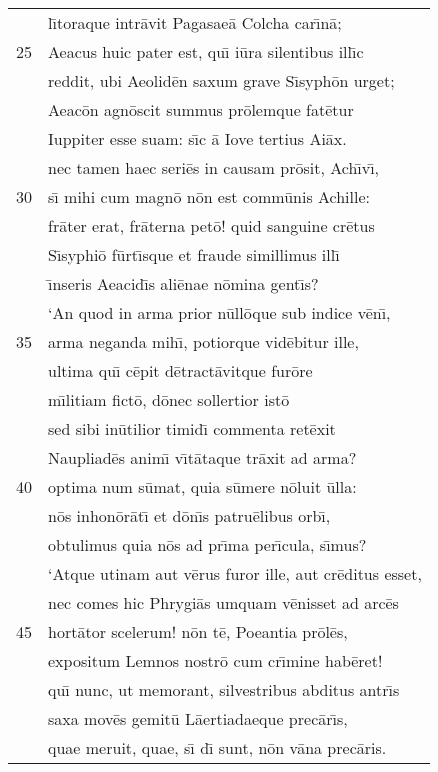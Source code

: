 \documentclass[paper=6in:9in,pagesize=pdftex,
               headinclude=on,footinclude=on,12pt]{scrbook}
\begin{document}
\begin{longtable}[p]{ r l }
 & l\={\i}toraque intr\=avit Pagasae\=a Colcha car\={\i}n\=a;\\ 
25 & Aeacus huic pater est, qu\={\i} i\=ura silentibus ill\={\i}c\\ 
 & reddit, ubi Aeolid\=en saxum grave S\={\i}syph\=on urget;\\ 
 & Aeac\=on agn\=oscit summus pr\=olemque fat\=etur\\ 
 & Iuppiter esse suam: s\={\i}c \=a Iove tertius Ai\=ax.\\ 
 & nec tamen haec seri\=es in causam pr\=osit, Ach\={\i}v\={\i},\\ 
30 & s\={\i} mihi cum magn\=o n\=on est comm\=unis Achille:\\ 
 & fr\=ater erat, fr\=aterna pet\=o! quid sanguine cr\=etus\\ 
 & S\={\i}syphi\=o f\=urt\={\i}sque et fraude simillimus ill\={\i}\\ 
 & \={\i}nseris Aeacid\={\i}s ali\=enae n\=omina gent\={\i}s?\\ 
 & \indent `An quod in arma prior n\=ull\=oque sub indice v\=en\={\i},\\ 
35 & arma neganda mih\={\i}, potiorque vid\=ebitur ille,\\ 
 & ultima qu\={\i} c\=epit d\=etract\=avitque fur\=ore\\ 
 & m\={\i}litiam fict\=o, d\=onec sollertior ist\=o\\ 
 & sed sibi in\=utilior timid\={\i} commenta ret\=exit\\ 
 & Naupliad\=es anim\={\i} v\={\i}t\=ataque tr\=axit ad arma?\\ 
40 & optima num s\=umat, quia s\=umere n\=oluit \=ulla:\\ 
 & n\=os inhon\=or\=at\={\i} et d\=on\={\i}s patru\=elibus orb\={\i},\\ 
 & obtulimus quia n\=os ad pr\={\i}ma per\={\i}cula, s\={\i}mus?\\ 
 & \indent `Atque utinam aut v\=erus furor ille, aut cr\=editus esset,\\ 
 & nec comes hic Phrygi\=as umquam v\=enisset ad arc\=es\\ 
45 & hort\=ator scelerum! n\=on t\=e, Poeantia pr\=ol\=es,\\ 
 & expositum Lemnos nostr\=o cum cr\={\i}mine hab\=eret!\\ 
 & qu\={\i} nunc, ut memorant, silvestribus abditus antr\={\i}s\\ 
 & saxa mov\=es gemit\=u L\=aertiadaeque prec\=ar\={\i}s,\\ 
 & quae meruit, quae, s\={\i} d\={\i} sunt, n\=on v\=ana prec\=aris.\\ 

\end{longtable}
\end{document}
